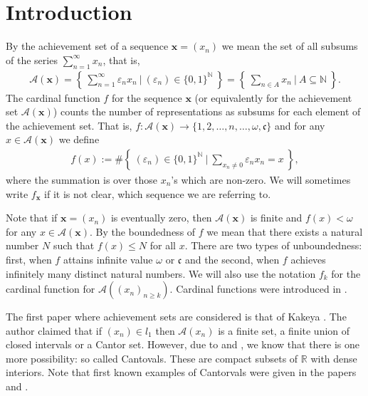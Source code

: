 \documentclass{amsart}
\theoremstyle{definition}
\begin{document}
\section{Introduction}
By the achievement set of a sequence $\mathbf{x}=(x_n)$ we mean the set of all subsums of the series $\sum_{n=1}^{\infty}x_n$, that is, 
\begin{align*}
\mathcal{A}(\mathbf{x})=\left\{\ \sum_{n=1}^{\infty}\varepsilon_n x_n \ \Bigg|\  (\varepsilon_n)\in\{0,1\}^\mathbb{N}\ \right\}=\left\{\ \sum_{n\in A}x_n \ \Bigg|\ A\subseteq\mathbb{N} \ \right\}. 
\end{align*}
The cardinal function $f$ for the sequence $\mathbf{x}$ (or equivalently for the achievement set $\mathcal{A}(\mathbf{x})$) counts the number of representations as subsums for each element of the achievement set. That is, $f: \mathcal{A}(\mathbf{x})\rightarrow \{1,2,\ldots,n,\ldots,\omega,\mathfrak{c}\}$ and for any $x\in \mathcal{A}(\mathbf{x})$ we define 
\begin{align*}
f(x):= \# \left\{\ (\varepsilon_n)\in\{0,1\}^\mathbb{N}\ \Bigg|\ \sum_{x_n\neq 0}\varepsilon_n x_n =x \ \right\},
\end{align*}
where the summation is over those $x_n$'s which are non-zero. We will sometimes write $f_{\textbf{x}}$ if it is not clear, which sequence we are referring to.

Note that if $\mathbf{x}=(x_n)$ is eventually zero, then $\mathcal{A}(\mathbf{x})$ is finite and $f(x)<\omega$ for any $x\in \mathcal{A}(\mathbf{x})$. By the boundedness of $f$ we mean that there exists a natural number $N$ such that $f(x)\leq N$ for all $x$. There are two types of unboundedness: first, when $f$ attains infinite value $\omega$ or $\mathfrak{c}$ and the second, when $f$ achieves infinitely many distinct natural numbers.  
We will also use the notation $f_k$ for the cardinal function for $\mathcal{A}((x_n)_{n\geq k})$.  Cardinal functions were introduced in \cite{cardfun}.%
 
 The first paper where achievement sets are considered is that of Kakeya \cite{Kakeya}. The author claimed that if $(x_n)\in l_1$ then $\mathcal{A}(x_n)$ is a finite set, a finite union of closed intervals or a Cantor set. However, due to \cite{GN} and \cite{NS0}, we know that there is one more possibility: so called Cantovals. These are compact subsets of $\mathbb{R}$ with dense interiors. Note that first known examples of Cantorvals were given in the papers \cite{F} and \cite{WS}.
\end{document}
